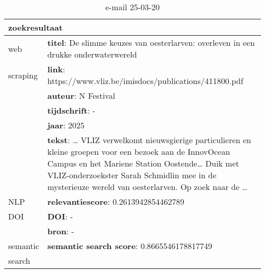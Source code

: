 \begin{table}[h!]
    \caption{e-mail 25-03-20}
    \centering
    \begin{tabularx}{\textwidth}{|p{4cm}|X|} 
        \hline
        \multicolumn{2}{|X|}{\textbf{zoekresultaat}} \\
        \hline
        web &\textbf{titel}: De slimme keuzes van oesterlarven: overleven in een drukke onderwaterwereld\\
        scraping&\textbf{link}: https://www.vliz.be/imisdocs/publications/411800.pdf\\
        &\textbf{auteur}: N Festival\\
        &\textbf{tijdschrift}: -\\
        &\textbf{jaar}: 2025\\
        &\textbf{tekst}: … VLIZ verwelkomt nieuwsgierige particulieren en kleine groepen voor een bezoek aan de InnovOcean Campus en het Mariene Station Oostende… Duik met VLIZ-onderzoekster Sarah Schmidlin mee in de mysterieuze wereld van oesterlarven. Op zoek naar de …\\
        \hline
        NLP&\textbf{relevantiescore}: 0.2613942854462789\\
        \hline
        DOI&\textbf{DOI}: -\\
        &\textbf{bron}: -\\
        \hline
        semantic&\textbf{semantic search score}: 0.8665546178817749\\
        search&\\
        \hline
    \end{tabularx}
    \label{table:email20250320}
\end{table}

